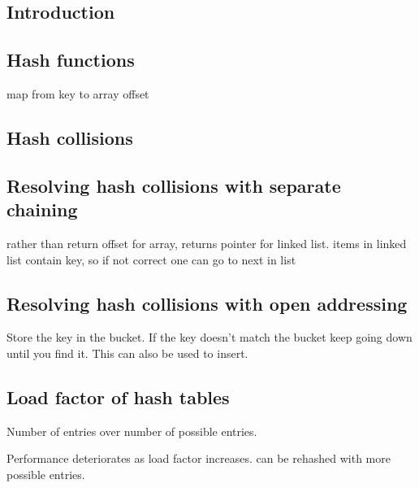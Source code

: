
\subsection{Introduction}

\subsection{Hash functions}

map from key to array offset

\subsection{Hash collisions}


\subsection{Resolving hash collisions with separate chaining}

rather than return offset for array, returns pointer for linked list. items in linked list contain key, so if not correct one can go to next in list

\subsection{Resolving hash collisions with open addressing}

Store the key in the bucket. If the key doesn't match the bucket keep going down until you find it. This can also be used to insert.

\subsection{Load factor of hash tables}

Number of entries over number of possible entries.

Performance deteriorates as load factor increases. can be rehashed with more possible entries.


